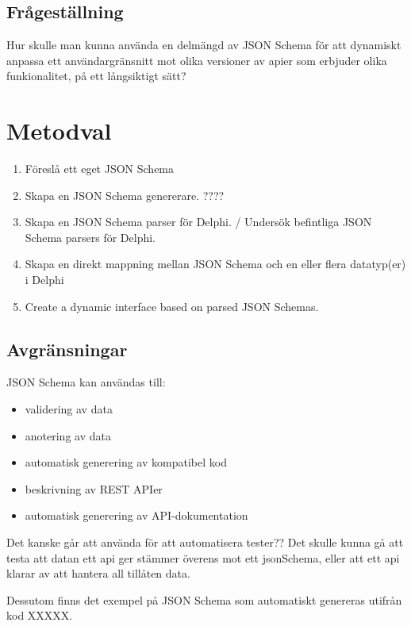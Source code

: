 \documentclass[swedish]{kththesis}
\begin{document}


\section{Frågeställning}

Hur skulle man kunna använda en delmängd av JSON Schema för att dynamiskt anpassa ett användargränsnitt mot olika versioner av apier som erbjuder olika funkionalitet, på ett långsiktigt sätt?


\chapter{Metodval}

\begin{enumerate}
	\item Föreslå ett eget JSON Schema
	\item Skapa en JSON Schema genererare. ????
	\item Skapa en JSON Schema parser för Delphi. / Undersök befintliga JSON Schema parsers för Delphi.
	\item Skapa en direkt mappning mellan JSON Schema och en eller flera datatyp(er) i Delphi
	\item Create a dynamic interface based on parsed JSON Schemas.
\end{enumerate}

\section{Avgränsningar}

JSON Schema kan användas till:
\begin{itemize}
	\item validering av data
	\item anotering av data
	\item automatisk generering av kompatibel kod
	\item beskrivning av REST APIer
	\item automatisk generering av API-dokumentation
\end{itemize}

Det kanske går att använda för att automatisera tester?? Det skulle kunna gå att testa att datan ett api ger stämmer överens mot ett jsonSchema, eller att ett api klarar av att hantera all tillåten data.

Dessutom finns det exempel på JSON Schema som automatiskt genereras utifrån kod XXXXX.
\end{document}
